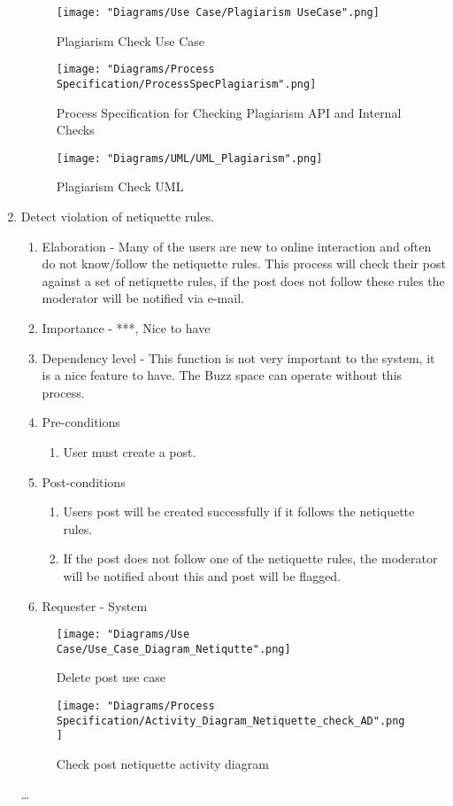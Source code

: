 \documentclass[12pt]{article}
\begin{document}
\begin{enumerate}
\begin{enumerate}
  \end{enumerate}
\begin{figure}[h]
	\centering
	\texttt{[image: "Diagrams/Use Case/Plagiarism UseCase".png]}
	\caption{Plagiarism Check Use Case}
\end{figure}
\begin{figure}[h]
	\centering
	\texttt{[image: "Diagrams/Process Specification/ProcessSpecPlagiarism".png]}
	\caption{Process Specification for Checking Plagiarism API and Internal Checks}
\end{figure}
\begin{figure}[h]
	\centering
	\texttt{[image: "Diagrams/UML/UML\_Plagiarism".png]}
	\caption{Plagiarism Check UML}
\end{figure}
\clearpage %
   \item Detect violation of netiquette rules. %
	\begin{enumerate}
  	\item Elaboration - Many of the users are new to online interaction and often do not know/follow the netiquette rules. This process will check their post against a set of netiquette rules, if the post does not follow these rules the moderator will be notified via e-mail.
   	 	\item Importance - ***, Nice to have
   	 	\item Dependency level - This function is not very important to the system, it is a nice feature to have. The Buzz space can operate without this process.
   	 	\item Pre-conditions
   		\begin{enumerate}
    		\item User must create a post.
    	\end{enumerate}
     	\item Post-conditions
    	\begin{enumerate}
  	  		\item Users post will be created successfully if it follows the netiquette rules.
  	  		\item If the post does not follow one of the netiquette rules, the moderator will be notified about this and post will be flagged.
   	 	\end{enumerate}
   	 	\item Requester - System
  	\end{enumerate}
  	\begin{figure}[h]
  		\centering
  		\texttt{[image: "Diagrams/Use Case/Use\_Case\_Diagram\_Netiqutte".png]}
  		\caption{Delete post use case}
  	\end{figure}
  	\begin{figure}[h]
  		\centering
  		\texttt{[image: "Diagrams/Process Specification/Activity\_Diagram\_Netiquette\_check\_AD".png]}
  		\caption{Check post netiquette activity diagram}
  	\end{figure}
  	\clearpage
  	\newpage
  \ldots
\end{enumerate}




\clearpage
\end{document}
